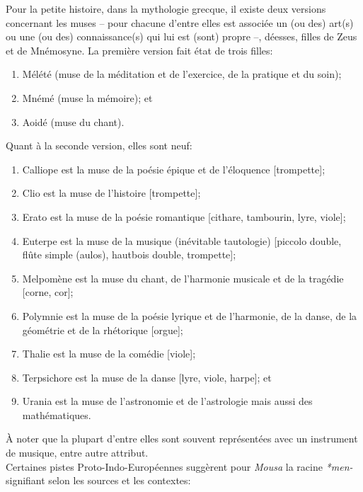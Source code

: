 \documentclass{article}
\begin{document}
{%
\indent Pour la petite histoire, dans la mythologie grecque, il existe deux versions concernant les muses -- pour chacune d'entre elles est associée un (ou des) art(s) ou une (ou des) connaissance(s) qui lui est (sont) propre --, déesses,  filles de Zeus et de Mnémosyne. La première version fait état de trois filles:
 \renewcommand{\labelenumi}{\arabic{enumi}.} \begin{enumerate}
\item Mélété (muse de la méditation et de l'exercice, de la pratique et du soin); 
\item Mnémé (muse la mémoire); et
\item Aoidé (muse du chant). 
\end{enumerate}
Quant à la seconde version, elles sont neuf:
 \begin{enumerate}
\item Calliope est la muse de la poésie épique et de l’éloquence [trompette];
\item Clio est la muse de l'histoire [trompette];
\item Erato est la muse de la poésie romantique %
[cithare, tambourin, lyre, viole];
\item Euterpe est la muse de la musique (inévitable tautologie) [piccolo double, flûte simple (aulos), hautbois double, trompette];
\item Melpomène est la muse du chant, de l’harmonie musicale et de la tragédie [corne, cor];
\item Polymnie est la muse de la poésie lyrique et de l’harmonie, de la danse, de la géométrie et de la rhétorique [orgue];
\item Thalie est la muse de la comédie [viole];
\item Terpsichore est la muse de la danse %
[lyre, viole, harpe]; et
\item Urania est la muse de l’astronomie et de l’astrologie mais aussi des mathématiques.
\end{enumerate}
À noter que la plupart d'entre elles sont souvent représentées avec un instrument de musique, entre autre attribut.\\ \indent Certaines pistes Proto-Indo-Européennes suggèrent pour \textit{Mousa} la racine \textit{*men-} signifiant selon les sources et les contextes:
}
\end{document}
